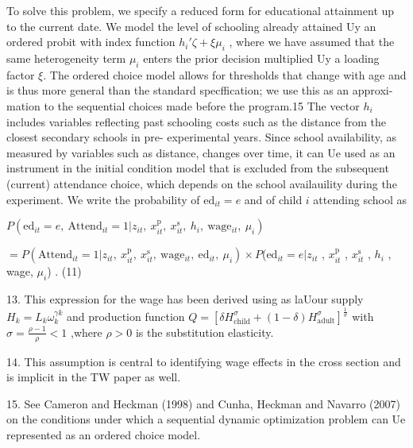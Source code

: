 To solve this problem, we specify a reduced form for educational attainment up to the current date. We model the level of schooling already attained Uy an ordered probit with index function $h_{i}'\zeta+\xi\mu_{i}$ , where we have assumed that the same heterogeneity term $\mu_{i}$ enters the prior decision multiplied Uy a loading factor $\xi$. The ordered choice model allows for thresholds that change with age and is thus more general than the standard specffication; we use this as an approxi- mation to the sequential choices made before the program.15 The vector $h_{i}$ includes variables reflecting past schooling costs such as the distance from the closest secondary schools in pre- experimental years. Since school availability, as measured by variables such as distance, changes over time, it can Ue used as an instrument in the initial condition model that is excluded from the subsequent (current) attendance choice, which depends on the school availauility during the experiment. We write the probability of $\mathrm{e}\mathrm{d}_{it}=e$ and of child $i$ attending school as

$P(\mathrm{e}\mathrm{d}_{it}=e,\ \mathrm{A}\mathrm{t}\mathrm{t}\mathrm{e}\mathrm{n}\mathrm{d}_{it}=1|z_{it},\ x_{it}^{\mathrm{p}},\ x_{it}^{\mathrm{s}},\ h_{i},\ \mathrm{w}\mathrm{a}\mathrm{g}\mathrm{e}_{it},\ \mu_{i})$

$=P (\mathrm{A}\mathrm{t}\mathrm{t}\mathrm{e}\mathrm{n}\mathrm{d}_{it}=1|z_{it},\ x_{it}^{\mathrm{p}},\ x_{it}^{\mathrm{s}},\ \mathrm{w}\mathrm{a}\mathrm{g}\mathrm{e}_{it},\ \mathrm{e}\mathrm{d}_{it},\ \mu_{i})\times P$($\mathrm{e}\mathrm{d}_{it}=e|z_{it}$ , $x_{it}^{\mathrm{p}}$ , $x_{it}^{\mathrm{s}}$ , $h_{i}$ , wage, $\mu_{i}$) . (11)

13. This expression for the wage has been derived using as laUour supply $H_{k}=L_{k}\omega_{k}^{\gamma k}$ and production function $Q=[\delta H_{\mathrm{c}\mathrm{h}\mathrm{i}\mathrm{l}\mathrm{d}}^{\sigma}+(1-\delta)H_{\mathrm{a}\mathrm{d}\mathrm{u}\mathrm{l}\mathrm{t}}^{\sigma}]^{\frac{1}{\sigma}}$ with $\displaystyle \sigma=\frac{\rho-1}{\rho} <1$ ,where $\rho>0$ is the substitution elasticity.

14. This assumption is central to identifying wage effects in the cross section and is implicit in the TW paper as well.

15. See Cameron and Heckman (1998) and Cunha, Heckman and Navarro (2007) on the conditions under which a sequential dynamic optimization problem can Ue represented as an ordered choice model.

